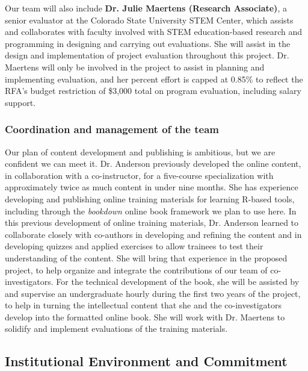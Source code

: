 \documentclass[pdftex,english,11pt,parskip=half]{scrartcl}
\begin{document}
\noindent Our team will also include \textbf{Dr. Julie Maertens (Research Associate)}, a senior evaluator
at the Colorado State University STEM Center, which assists and collaborates
with faculty involved with STEM education-based research and programming in
designing and carrying out evaluations. She will assist in the design and
implementation of project evaluation throughout this project. Dr. Maertens will
only be involved in the project to assist in planning and implementing
evaluation, and her percent effort is capped at 0.85\% to reflect the RFA's
budget restriction of \$3,000 total on program evaluation, including salary
support.

\subsubsection*{Coordination and management of the team}



Our plan of content development and publishing is ambitious, but we are
confident we can meet it. Dr. Anderson previously developed the online content,
in collaboration with a co-instructor, for a five-course specialization with
approximately twice as much content in under nine months. She has experience
developing and publishing online training materials for learning R-based tools,
including through the \textit{bookdown} online book framework we plan to use
here. In this previous development of online training materials, Dr. Anderson
learned to collaborate closely with co-authors in developing and refining the
content and in developing quizzes and applied exercises to allow trainees to
test their understanding of the content. She will bring that experience in the
proposed project, to help organize and integrate the contributions of our team
of co-investigators. For the technical development of the book, she will be
assisted by and supervise an undergraduate hourly during the first two years of
the project, to help in turning the intellectual content that she and the
co-investigators develop into the formatted online book. She will work with Dr.
Maertens to solidify and implement evaluations of the training materials.

\subsection{Institutional Environment and Commitment}
\end{document}
